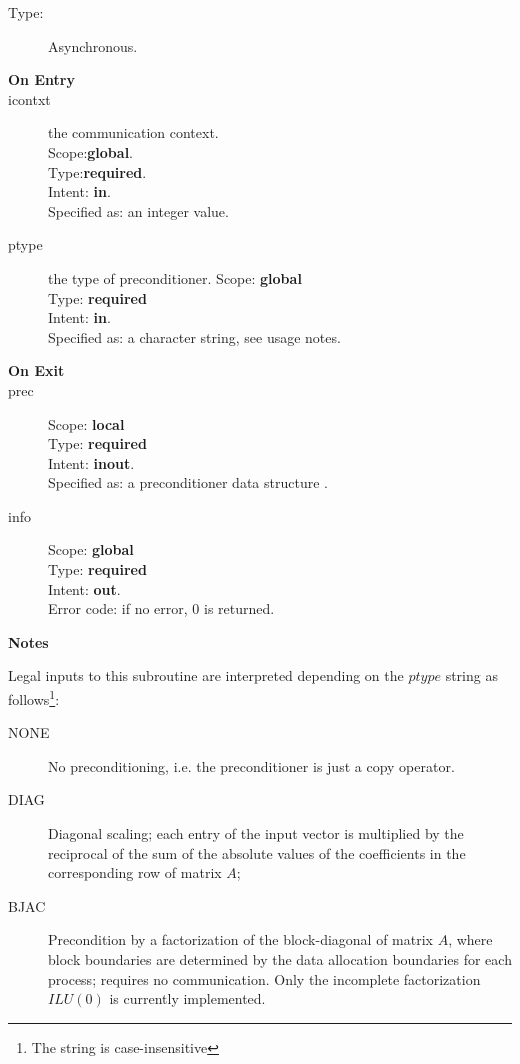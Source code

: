 \begin{description}
\item[Type:] Asynchronous.
\item[\bf On Entry]
\item[icontxt] the communication context.\\
Scope:{\bf global}.\\
Type:{\bf required}.\\
Intent: {\bf in}.\\
Specified as: an integer value.
\item[ptype] the type of preconditioner. 
Scope: {\bf global} \\
Type: {\bf required}\\
Intent: {\bf in}.\\
Specified as: a character string, see usage notes.
\item[\bf On Exit]

\item[prec] 
Scope: {\bf local} \\
Type: {\bf required}\\
Intent: {\bf inout}.\\
Specified as: a preconditioner data structure \precdata.
\item[info] 
Scope: {\bf global} \\
Type: {\bf required}\\
Intent: {\bf out}.\\
Error code: if no error, 0 is returned.
\end{description}
{\par\noindent\large\bfseries Notes}
Legal inputs to this subroutine are interpreted depending on the
$ptype$ string as follows\footnote{The string is case-insensitive}:
\begin{description}
\item[NONE] No preconditioning, i.e. the preconditioner is just a copy
  operator.
\item[DIAG] Diagonal scaling; each entry of the input vector is
  multiplied by the reciprocal of the sum of the absolute values of
  the coefficients in the corresponding row of matrix  $A$;
\item[BJAC] Precondition by a  factorization of the
  block-diagonal of matrix $A$, where block boundaries are determined
  by the data allocation boundaries for each process; requires no
  communication. Only the incomplete factorization $ILU(0)$ is
  currently implemented.  
\end{description}


